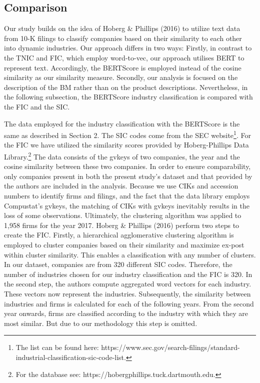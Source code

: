\documentclass[
]{article}
\begin{document}
\subsection{Comparison}\label{comparison}

Our study builds on the idea of Hoberg \& Phillips (2016) to utilize
text data from 10-K filings to classify companies based on their
similarity to each other into dynamic industries. Our approach differs
in two ways: Firstly, in contrast to the TNIC and FIC, which employ
word-to-vec, our approach utilises BERT to represent text. Accordingly,
the BERTScore is employed instead of the cosine similarity as our
similarity measure. Secondly, our analysis is focused on the description
of the BM rather than on the product descriptions. Nevertheless, in the
following subsection, the BERTScore industry classification is compared
with the FIC and the SIC.

The data employed for the industry classification with the BERTScore is
the same as described in Section 2. The SIC codes come from the SEC
website\footnote{The list can be found here:
  https://www.sec.gov/search-filings/standard-industrial-classification-sic-code-list.}.
For the FIC we have utilized the similarity scores provided by
Hoberg-Phillips Data Library.\footnote{For the database see:
  https://hobergphillips.tuck.dartmouth.edu.} The data consists of the
gvkeys of two companies, the year and the cosine similarity between
these two companies. In order to ensure comparability, only companies
present in both the present study's dataset and that provided by the
authors are included in the analysis. Because we use CIKs and accession
numbers to identify firms and filings, and the fact that the data
library employs Compustat's gvkeys, the matching of CIKs with gvkeys
inevitably results in the loss of some observations. Ultimately, the
clustering algorithm was applied to 1,958 firms for the year 2017.
Hoberg \& Phillips (2016) perform two steps to create the FIC. Firstly,
a hierarchical agglomerative clustering algorithm is employed to cluster
companies based on their similarity and maximize ex-post within cluster
similarity. This enables a classification with any number of clusters.
In our dataset, companies are from 320 different SIC codes. Therefore,
the number of industries chosen for our industry classification and the
FIC is 320. In the second step, the authors compute aggregated word
vectors for each industry. These vectors now represent the industries.
Subsequently, the similarity between industries and firms is calculated
for each of the following years. From the second year onwards, firms are
classified according to the industry with which they are most similar.
But due to our methodology this step is omitted.
\end{document}
